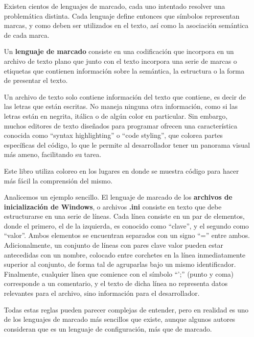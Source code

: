 Existen cientos de lenguajes de marcado, cada uno intentado resolver una
problemática distinta. Cada lenguaje define entonces que símbolos representan
marcas, y como deben ser utilizados en el texto, así como la asociación
semántica de cada marca.\autocite{coombs_1987}

\begin{definition} Un \textbf{lenguaje de marcado}
    consiste en una codificación que incorpora en un archivo de texto plano que
    junto con el texto incorpora una serie de marcas o etiquetas que contienen
    información sobre la semántica, la estructura o la forma de presentar el
    texto.
\end{definition}

\begin{knowwhat}
    Un archivo de texto solo contiene información del texto que contiene, es
    decir de las letras que están escritas. No maneja ninguna otra información,
    como si las letras están en negrita, itálica o de algún color en particular.
    Sin embargo, muchos editores de texto diseñados para programar ofrecen una
    característica conocida como ``syntax highlighting'' o ``code styling'', que
    colorea partes específicas del código, lo que le permite al desarrollador
    tener un panorama visual más ameno, facilitando su tarea.

    Este libro utiliza coloreo en los lugares en donde se muestra código para
    hacer más fácil la comprensión del mismo.
\end{knowwhat}

Analicemos un ejemplo sencillo. El lenguaje de marcado de los \textbf{archivos
de inicialización de Windows}, o archivos \textbf{.ini} consiste en texto que
debe estructurarse en una serie de líneas. Cada línea consiste en un par de
elementos, donde el primero, el de la izquierda, es conocido como ``clave'', y
el segundo como ``valor''. Ambos elementos se encuentran separados con un signo
``='' entre ambos. Adicionalmente, un conjunto de líneas con pares clave valor
pueden estar antecedidas con un nombre, colocado entre corchetes en la línea
inmediatamente superior al conjunto, de forma tal de agruparlas bajo un mismo
identificador. Finalmente, cualquier línea que comience con el símbolo ``';''
(punto y coma) corresponde a un comentario, y el texto de dicha línea no
representa datos relevantes para el archivo, sino información para el
desarrollador.
\autocite{getPrivateProfileString_2018}

Todas estas reglas pueden parecer complejas de entender, pero en realidad es uno
de los lenguajes de marcado más sencillos que existe, aunque algunos autores
consideran que es un lenguaje de configuración, más que de marcado.

